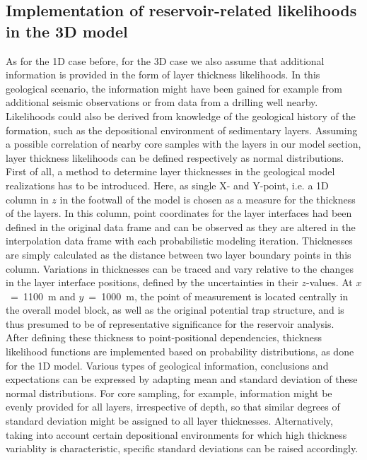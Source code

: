 		\subsection{Implementation of reservoir-related likelihoods in the 3D model}
		As for the 1D case before, for the 3D case we also assume that additional information is provided in the form of layer thickness likelihoods. In this geological scenario, the information might have been gained for example from additional seismic observations or from data from a drilling well nearby. Likelihoods could also be derived from knowledge of the geological history of the formation, such as the depositional environment of sedimentary layers. Assuming a possible correlation of nearby core samples with the layers in our model section, layer thickness likelihoods can be defined respectively as normal distributions.\\
		First of all, a method to determine layer thicknesses in the geological model realizations has to be introduced. Here, as single X- and Y-point, i.e. a 1D column in $z$ in the footwall of the model is chosen as a measure for the thickness of the layers. In this column, point coordinates for the layer interfaces had been defined in the original data frame and can be observed as they are altered in the interpolation data frame with each probabilistic modeling iteration. Thicknesses are simply calculated as the distance between two layer boundary points in this column. Variations in thicknesses can be traced and vary relative to the changes in the layer interface positions, defined by the uncertainties in their $z$-values. At $x$~=~1100~m and $y$~=~1000~m, the point of measurement is located centrally in the overall model block, as well as the original potential trap structure, and is thus presumed to be of representative significance for the reservoir analysis.\\
		After defining these thickness to point-positional dependencies, thickness likelihood functions are implemented based on probability distributions, as done for the 1D model. Various types of geological information, conclusions and expectations can be expressed by adapting mean and standard deviation of these normal distributions. For core sampling, for example, information might be evenly provided for all layers, irrespective of depth, so that similar degrees of standard deviation might be assigned to all layer thicknesses. Alternatively, taking into account certain depositional environments for which high thickness variablity is characteristic, specific standard deviations can be raised accordingly.\\

